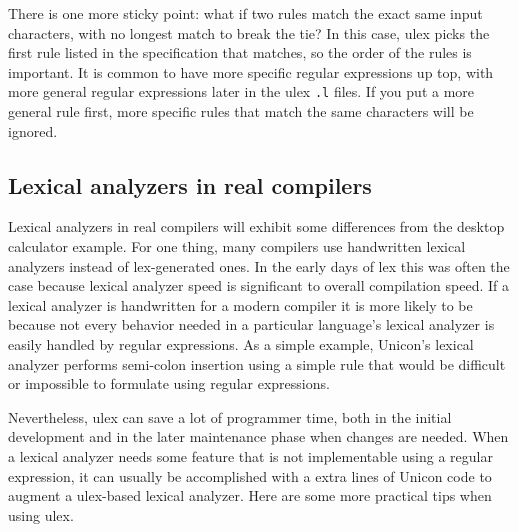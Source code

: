 There is one more sticky point: what if two rules match the exact same input
characters, with no longest match to break the tie? In this case, \textsf{ulex}
picks the first rule listed in the specification that matches, so the order of
the rules is important.  It is common to have more specific regular expressions
up top, with more general regular expressions later in the \textsf{ulex}
\texttt{.l} files. If you put a more general rule first, more specific rules
that match the same characters will be ignored.

\subsection{Lexical analyzers in real compilers}

Lexical analyzers in real compilers will exhibit some differences from
the desktop calculator example. For one thing, many compilers use
handwritten lexical analyzers instead of lex-generated ones. In the
early days of lex this was often the case because lexical analyzer speed is
significant to overall compilation speed. If a lexical analyzer is
handwritten for a modern compiler it is more likely to be because not every
behavior needed in a particular language's lexical analyzer is easily
handled by regular expressions. As a simple example, Unicon's lexical
analyzer performs semi-colon insertion using a simple rule that would
be difficult or impossible to formulate using regular expressions.

Nevertheless, ulex can save a lot of programmer time, both in the
initial development and in the later maintenance phase when
changes are needed. When a lexical analyzer needs some feature that
is not implementable using a regular expression, it can usually be
accomplished with a extra lines of Unicon code to augment a ulex-based
lexical analyzer. Here are some more practical tips when using ulex.

